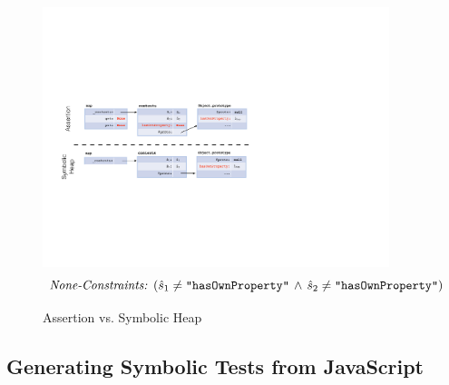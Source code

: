 \begin{figure}[t!]
\includegraphics[width=0.9\textwidth]{figures/symbolicvsass.pdf}
{\small $$
\text{\emph{None-Constraints: }} (\hat{s}_1 \neq \texttt{"hasOwnProperty"} \, \wedge \, \hat{s}_2 \neq \texttt{"hasOwnProperty"})
$$}
\vspace{-25pt}
\caption{Assertion vs. Symbolic Heap}
\end{figure}





\subsection{Generating Symbolic Tests from JavaScript} 
\label{specs:example}

